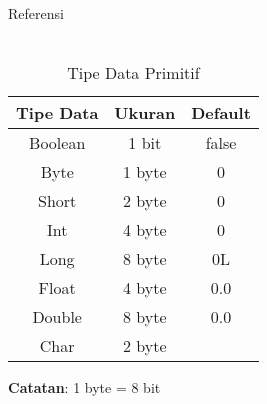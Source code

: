 \documentclass[aspectratio=169]{beamer}
\theoremstyle{definition}
\begin{document}
{\begin{frame}
\begin{columns}
\begin{column}{0.45\textwidth}
\begin{block}{\color{cyan}Referensi}
                \end{block}
            \end{column}
        \end{columns}
    \end{frame}
    }

    \begin{frame}
        \frametitle{\insertsection}
        \begin{table}
            \centering
            \begin{tabular}{|c|c|c|}
                \hline
                \rowcolor{HIMAmuda}
                \textbf{Tipe Data} & \textbf{Ukuran} & \textbf{Default}\\
                \hline
                Boolean & 1 bit & false\\
                Byte & 1 byte & 0\\
                Short & 2 byte & 0\\
                Int & 4 byte & 0\\
                Long & 8 byte & 0L\\
                Float & 4 byte & 0.0\\
                Double & 8 byte & 0.0\\
                Char & 2 byte & \\
                \hline
            \end{tabular}
            \caption{Tipe Data Primitif}
        \end{table}
        {\footnotesize \textbf{Catatan}: 1 byte = 8 bit}
    \end{frame}
\end{document}
